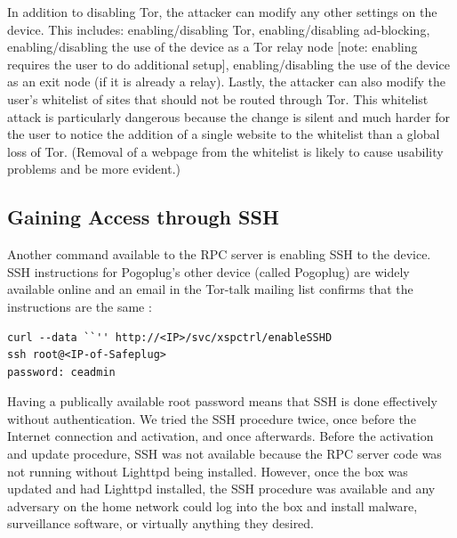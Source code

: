 \documentclass[conference]{IEEEtran}
\begin{document}
In addition to disabling Tor, the attacker can modify any other settings on the device.  This includes: enabling/disabling Tor, enabling/disabling ad-blocking, enabling/disabling the use of the device as a Tor relay node [note: enabling requires the user to do additional setup], enabling/disabling the use of the device as an exit node (if it is already a relay).  Lastly, the attacker can also modify the user's whitelist of sites that should not be routed through Tor.  This whitelist attack is particularly dangerous because the change is silent and much harder for the user to notice the addition of a single website to the whitelist than a global loss of Tor.  (Removal of a webpage from the whitelist is likely to cause usability problems and be more evident.)

\subsection{Gaining Access through SSH}
\label{sec:SSH}
    Another command available to the RPC server is enabling SSH to the device.  SSH instructions for Pogoplug's other device (called Pogoplug) are widely available online and an email in the Tor-talk mailing list confirms that the instructions are the same \cite{ceadmin}:
\begin{lstlisting}
curl --data ``'' http://<IP>/svc/xspctrl/enableSSHD
ssh root@<IP-of-Safeplug>
password: ceadmin
\end{lstlisting}

Having a publically available root password means that SSH is done effectively without authentication.  We tried the SSH procedure twice, once before the Internet connection and activation, and once afterwards.  Before the activation and update procedure, SSH was not available because the RPC server code was not running without Lighttpd being installed.  However, once the box was updated and had Lighttpd installed, the SSH procedure was available and any adversary on the home network could log into the box and install malware, surveillance software, or virtually anything they desired.
\end{document}
